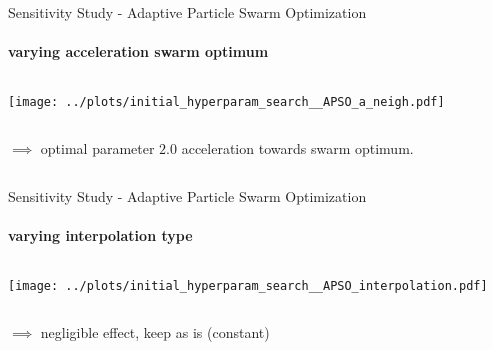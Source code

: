 \documentclass[11pt,aspectratio=169]{beamer}
\begin{document}
\begin{frame}{Sensitivity Study - Adaptive Particle Swarm Optimization}
    \framesubtitle{varying \textbf{acceleration swarm optimum}}

    \begin{columns}
    \begin{column}{0.8\textwidth}
        \texttt{[image: ../plots/initial\_hyperparam\_search\_\_APSO\_a\_neigh.pdf]}
    \end{column}
    \end{columns}

    \begin{columns}
        \begin{column}{0.8\textwidth}
            $\implies$ optimal parameter $2.0$ acceleration towards swarm optimum.
        \end{column}
        \begin{column}{0.1\textwidth}
            \tiny{}
        \end{column}
    \end{columns}
\end{frame}


%
%

\begin{frame}{Sensitivity Study - Adaptive Particle Swarm Optimization}
    \framesubtitle{varying \textbf{interpolation type}}

    \begin{columns}
    \begin{column}{0.8\textwidth}
        \texttt{[image: ../plots/initial\_hyperparam\_search\_\_APSO\_interpolation.pdf]}
    \end{column}
    \end{columns}

    \begin{columns}
        \begin{column}{0.8\textwidth}
            $\implies$ negligible effect, keep as is (constant)
        \end{column}
        \begin{column}{0.1\textwidth}
            \tiny{}
        \end{column}
    \end{columns}
\end{frame}

%
%
\end{document}
